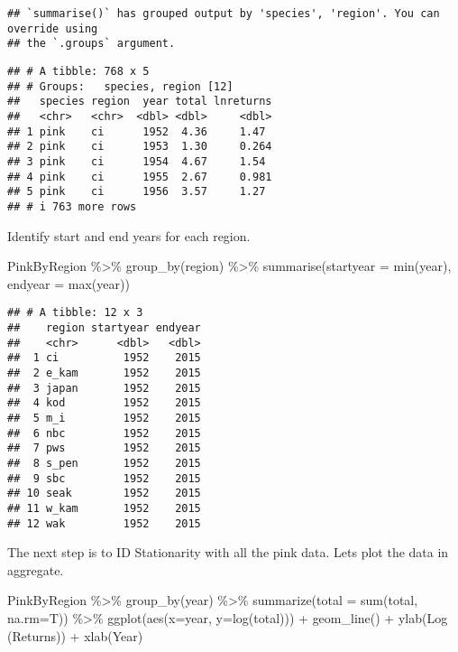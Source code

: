 \documentclass[
]{article}
\newenvironment{Shaded}{\begin{snugshade}}{\end{snugshade}}
\newcommand{\AttributeTok}[1]{\textcolor[rgb]{0.77,0.63,0.00}{#1}}
\newcommand{\FunctionTok}[1]{\textcolor[rgb]{0.00,0.00,0.00}{#1}}
\newcommand{\NormalTok}[1]{#1}
\newcommand{\SpecialCharTok}[1]{\textcolor[rgb]{0.00,0.00,0.00}{#1}}
\newcommand{\StringTok}[1]{\textcolor[rgb]{0.31,0.60,0.02}{#1}}
\begin{document}
\begin{verbatim}
## `summarise()` has grouped output by 'species', 'region'. You can override using
## the `.groups` argument.
\end{verbatim}

\begin{verbatim}
## # A tibble: 768 x 5
## # Groups:   species, region [12]
##   species region  year total lnreturns
##   <chr>   <chr>  <dbl> <dbl>     <dbl>
## 1 pink    ci      1952  4.36     1.47 
## 2 pink    ci      1953  1.30     0.264
## 3 pink    ci      1954  4.67     1.54 
## 4 pink    ci      1955  2.67     0.981
## 5 pink    ci      1956  3.57     1.27 
## # i 763 more rows
\end{verbatim}

Identify start and end years for each region.

\begin{Shaded}
\begin{Highlighting}[]
\NormalTok{PinkByRegion }\SpecialCharTok{\%\textgreater{}\%} \FunctionTok{group\_by}\NormalTok{(region) }\SpecialCharTok{\%\textgreater{}\%} \FunctionTok{summarise}\NormalTok{(}\AttributeTok{startyear =} \FunctionTok{min}\NormalTok{(year), }\AttributeTok{endyear =} \FunctionTok{max}\NormalTok{(year))}
\end{Highlighting}
\end{Shaded}

\begin{verbatim}
## # A tibble: 12 x 3
##    region startyear endyear
##    <chr>      <dbl>   <dbl>
##  1 ci          1952    2015
##  2 e_kam       1952    2015
##  3 japan       1952    2015
##  4 kod         1952    2015
##  5 m_i         1952    2015
##  6 nbc         1952    2015
##  7 pws         1952    2015
##  8 s_pen       1952    2015
##  9 sbc         1952    2015
## 10 seak        1952    2015
## 11 w_kam       1952    2015
## 12 wak         1952    2015
\end{verbatim}

The next step is to ID Stationarity with all the pink data. Lets plot
the data in aggregate.

\begin{Shaded}
\begin{Highlighting}[]
\NormalTok{PinkByRegion }\SpecialCharTok{\%\textgreater{}\%}
  \FunctionTok{group\_by}\NormalTok{(year) }\SpecialCharTok{\%\textgreater{}\%}
  \FunctionTok{summarize}\NormalTok{(}\AttributeTok{total =} \FunctionTok{sum}\NormalTok{(total, }\AttributeTok{na.rm=}\NormalTok{T)) }\SpecialCharTok{\%\textgreater{}\%}
  \FunctionTok{ggplot}\NormalTok{(}\FunctionTok{aes}\NormalTok{(}\AttributeTok{x=}\NormalTok{year, }\AttributeTok{y=}\FunctionTok{log}\NormalTok{(total))) }\SpecialCharTok{+}
  \FunctionTok{geom\_line}\NormalTok{() }\SpecialCharTok{+}
  \FunctionTok{ylab}\NormalTok{(}\StringTok{\textquotesingle{}Log (Returns)\textquotesingle{}}\NormalTok{) }\SpecialCharTok{+}
  \FunctionTok{xlab}\NormalTok{(}\StringTok{\textquotesingle{}Year\textquotesingle{}}\NormalTok{)}
\end{Highlighting}
\end{Shaded}
\end{document}
